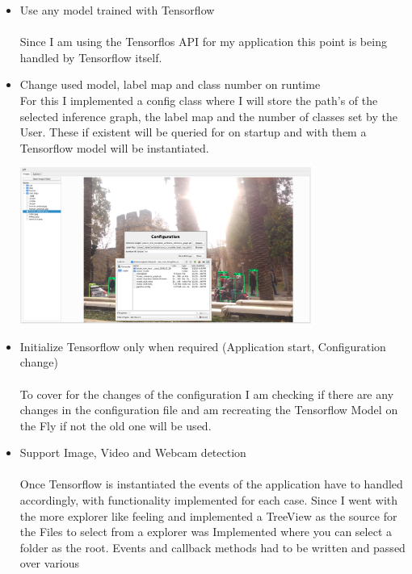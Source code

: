 \begin{itemize}
    \item Use any model trained with Tensorflow \\ \\
        Since I am using the Tensorflos API for my application this point is being handled by Tensorflow itself.\\
    \item Change used model, label map and class number on runtime \\
        For this I implemented a config class where I will store the path's of the selected inference graph, the label map and the
        number of classes set by the User. These if existent will be queried for on startup and with them a Tensorflow model will be instantiated.\\
        \begin{center}
            \includegraphics[width=0.75\textwidth]{images/application/application_config.png}
        \end{center}
    \item Initialize Tensorflow only when required (Application start, Configuration change)\\ \\
        To cover for the changes of the configuration I am checking if there are any changes in the configuration file and am recreating the
        Tensorflow Model on the Fly if not the old one will be used.
    \item Support Image, Video and Webcam detection \\ \\
        Once Tensorflow is instantiated the events of the application have to handled accordingly, with functionality implemented for each case.
        Since I went with the more explorer like feeling and implemented a TreeView as the source for the Files to select from a explorer
        was Implemented where you can select a folder as the root. Events and callback methods had to be written and passed over various

\end{itemize}
